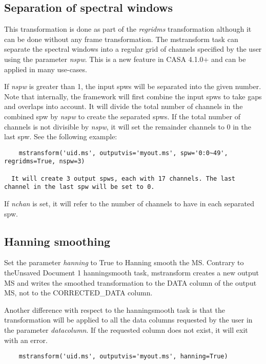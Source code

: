 \subsection{Separation of spectral windows}
This transformation is done as part of the {\it regridms} transformation
although it can be done without any frame transformation. The mstransform
task can separate the spectral windows into a regular grid of channels specified
by the user using the parameter {\it nspw}. This is a new feature in CASA
4.1.0+ and can be applied in many use-cases. %

If {\it nspw} is greater than 1, the input spws will be separated into the given
number. Note that internally, the framework will first combine the input
spws to take gaps and overlaps into account. It will divide the total number of
channels in the combined spw by {\it nspw} to create the separated spws. If the
total number of channels is not divisible by {\it nspw}, it will set the
remainder channels to 0 in the last spw. See the following example:

\begin{verbatim}
    mstransform('uid.ms', outputvis='myout.ms', spw='0:0~49', regridms=True, nspw=3)
  
  It will create 3 output spws, each with 17 channels. The last channel in the last spw will be set to 0.
\end{verbatim}

If {\it nchan} is set, it will refer to the number of channels to have in each
separated spw. 

\subsection{Hanning smoothing}
Set the parameter {\it hanning} to True to Hanning smooth the MS. Contrary to
theUnsaved Document 1 hanningsmooth task, mstransform creates a new output MS and writes the smoothed transformation
to the DATA column of the output MS, not to the CORRECTED_DATA column.

Another difference with respect to the hanningsmooth task is that the transformation will be 
applied to all the data columns requested by the user in the parameter {\it datacolumn}. If the 
requested column does not exist, it will exit with an error. 

\begin{verbatim}
    mstransform('uid.ms', outputvis='myout.ms', hanning=True)
\end{verbatim}

